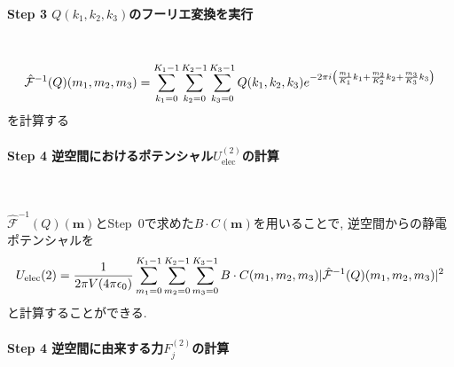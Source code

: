 \paragraph{Step 3 $Q(k_{1}, k_{2}, k_{3})$のフーリエ変換を実行} \
\begin{align}
   \hat{\mathcal{F}}^{-1} (Q) (m_{1}, m_{2}, m_{3})
 =
   \sum_{k_{1}=0}^{K_{1}-1} \sum_{k_{2}=0}^{K_{2}-1} \sum_{k_{3}=0}^{K_{3}-1}
   Q(k_{1}, k_{2}, k_{3})
   e^{-2 \pi i \left(\frac{m_{1}}{K_{1}}k_{1} + \frac{m_{2}}{K_{2}}k_{2} +\frac{m_{3}}{K_{3}}k_{3} \right)}
 \notag
\end{align}
を計算する
\paragraph{Step 4 逆空間におけるポテンシャル$U_{\mathrm{elec}}^{(2)}$の計算} \

$\hat{\mathcal{F}}^{-1}(Q)(\bm{m})$とStep~0で求めた$B \cdot C(\bm{m})$を用いることで,
逆空間からの静電ポテンシャルを
\begin{align}
    U_{\mathrm{elec}}{(2)}
 =
    \frac{1}{2 \pi V (4 \pi \epsilon_{0})}
    \sum_{m_{1}=0}^{K_{1}-1} \sum_{m_{2}=0}^{K_{2}-1} \sum_{m_{3}=0}^{K_{3}-1}
    B \cdot C(m_{1}, m_{2}, m_{3})
    | \hat{\mathcal{F}}^{-1}(Q) (m_{1}, m_{2}, m_{3}) |^{2}
 \notag
\end{align}
と計算することができる.
\paragraph{Step 4 逆空間に由来する力$F_{j}^{(2)}$の計算} \

